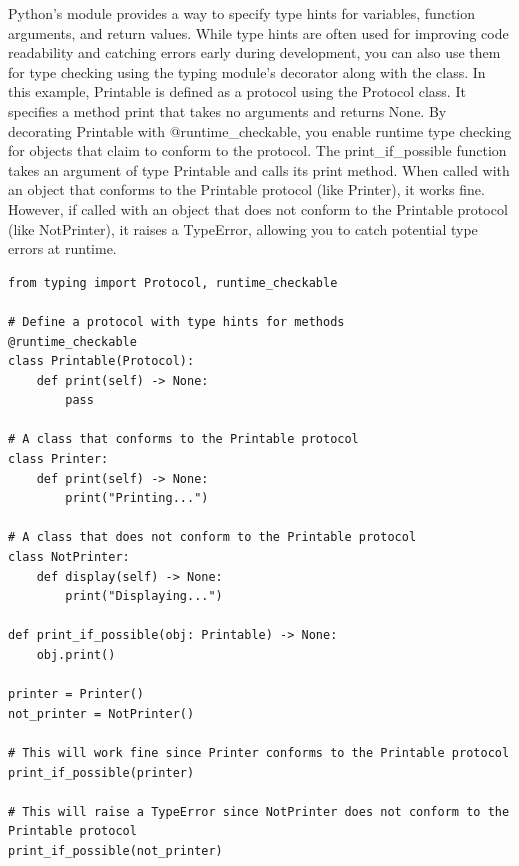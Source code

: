 Python's  module provides a way to specify type hints for variables, function arguments, and return values. While type hints are often used for improving code readability and catching errors early during development, you can also use them for  type checking using the typing module's  decorator along with the  class. In this example, Printable is defined as a protocol using the Protocol class. It specifies a method print that takes no arguments and returns None. By decorating Printable with @runtime\_checkable, you enable runtime type checking for objects that claim to conform to the protocol. The print\_if\_possible function takes an argument of type Printable and calls its print method. When called with an object that conforms to the Printable protocol (like Printer), it works fine. However, if called with an object that does not conform to the Printable protocol (like NotPrinter), it raises a TypeError, allowing you to catch potential type errors at runtime.
\begin{lstlisting}
from typing import Protocol, runtime_checkable

# Define a protocol with type hints for methods
@runtime_checkable
class Printable(Protocol):
    def print(self) -> None:
        pass

# A class that conforms to the Printable protocol
class Printer:
    def print(self) -> None:
        print("Printing...")

# A class that does not conform to the Printable protocol
class NotPrinter:
    def display(self) -> None:
        print("Displaying...")

def print_if_possible(obj: Printable) -> None:
    obj.print()

printer = Printer()
not_printer = NotPrinter()

# This will work fine since Printer conforms to the Printable protocol
print_if_possible(printer)

# This will raise a TypeError since NotPrinter does not conform to the Printable protocol
print_if_possible(not_printer)
\end{lstlisting}







\subsubsection{}

